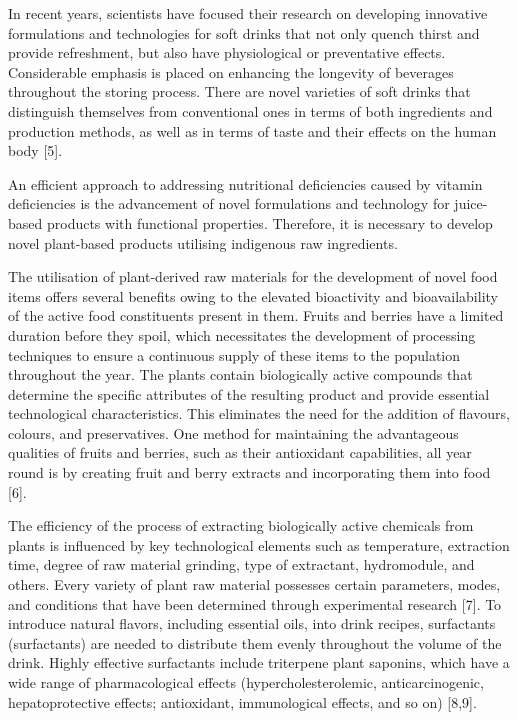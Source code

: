 \begin{multicols}{2}
In recent years, scientists have focused their research on developing
innovative formulations and technologies for soft drinks that not only
quench thirst and provide refreshment, but also have physiological or
preventative effects. Considerable emphasis is placed on enhancing the
longevity of beverages throughout the storing process. There are novel
varieties of soft drinks that distinguish themselves from conventional
ones in terms of both ingredients and production methods, as well as in
terms of taste and their effects on the human body {[}5{]}.~

An efficient approach to addressing nutritional deficiencies caused by
vitamin deficiencies is the advancement of novel formulations and
technology for juice-based products with functional properties.
Therefore, it is necessary to develop novel plant-based products
utilising indigenous raw ingredients.~

The utilisation of plant-derived raw materials for the development of
novel food items offers several benefits owing to the elevated
bioactivity and bioavailability of the active food constituents present
in them. Fruits and berries have a limited duration before they spoil,
which necessitates the development of processing techniques to ensure a
continuous supply of these items to the population throughout the year.
The plants contain biologically active compounds that determine the
specific attributes of the resulting product and provide essential
technological characteristics. This eliminates the need for the addition
of flavours, colours, and preservatives. One method for maintaining the
advantageous qualities of fruits and berries, such as their antioxidant
capabilities, all year round is by creating fruit and berry extracts and
incorporating them into food {[}6{]}.~

The efficiency of the process of extracting biologically active
chemicals from plants is influenced by key technological elements such
as temperature, extraction time, degree of raw material grinding, type
of extractant, hydromodule, and others. Every variety of plant raw
material possesses certain parameters, modes, and conditions that have
been determined through experimental research {[}7{]}. To introduce
natural flavors, including essential oils, into drink recipes,
surfactants (surfactants) are needed to distribute them evenly
throughout the volume of the drink. Highly effective surfactants include
triterpene plant saponins, which have a wide range of pharmacological
effects (hypercholesterolemic, anticarcinogenic, hepatoprotective
effects; antioxidant, immunological effects, and so on) {[}8,9{]}.


\end{multicols}
